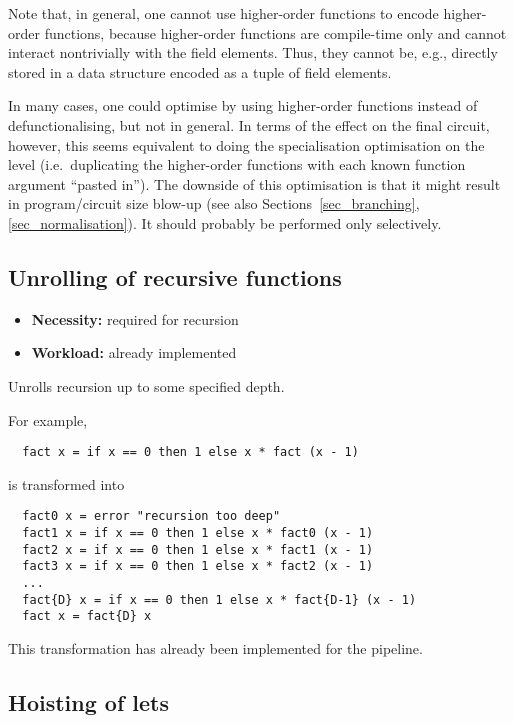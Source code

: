 \documentclass[final]{msc}
\begin{document}
Note that, in general, one cannot use \VampIR{} higher-order functions to
encode \Juvix{} higher-order functions, because \VampIR{} higher-order
functions are compile-time only and cannot interact nontrivially
with the field elements. Thus, they cannot be, e.g., directly stored in
a data structure encoded as a tuple of field elements.

In many cases, one could optimise by using \VampIR{} higher-order
functions instead of defunctionalising, but not in general. In terms
of the effect on the final circuit, however, this seems equivalent to
doing the specialisation optimisation on the \JuvixCore{} level
(i.e.~duplicating the higher-order functions with each known function
argument ``pasted in''). The downside of this optimisation is that it
might result in program/circuit size blow-up (see also
Sections~\ref{sec_branching},\ref{sec_normalisation}). It should
probably be performed only selectively.

\subsection{Unrolling of recursive functions}

\begin{itemize}
\item {\bf Necessity:} required for recursion
\item {\bf Workload:} already implemented
\end{itemize}

\noindent Unrolls recursion up to some specified depth.

\medskip

\noindent For example,
\begin{verbatim}
  fact x = if x == 0 then 1 else x * fact (x - 1)
\end{verbatim}
is transformed into
\begin{verbatim}
  fact0 x = error "recursion too deep"
  fact1 x = if x == 0 then 1 else x * fact0 (x - 1)
  fact2 x = if x == 0 then 1 else x * fact1 (x - 1)
  fact3 x = if x == 0 then 1 else x * fact2 (x - 1)
  ...
  fact{D} x = if x == 0 then 1 else x * fact{D-1} (x - 1)
  fact x = fact{D} x
\end{verbatim}
This transformation has already been implemented for the \Geb{} pipeline.

\subsection{Hoisting of lets}\label{sec_let_hoisting}
\end{document}
